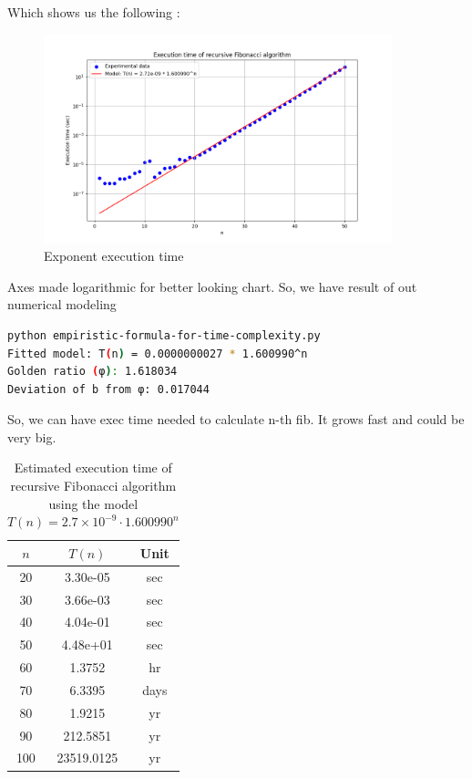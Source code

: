 \documentclass{article}
\begin{document}
Which shows us the following : 
\begin{figure}[H]
	\centering
	\includegraphics[width=0.9\textwidth]{./recursive-time-exec/experimental-data-formula.png}
	\caption{Exponent execution time}
	\label{fig:experimental_vs_theoretical}
\end{figure}

Axes made logarithmic for better looking chart.
So, we have result of out numerical modeling 
\begin{lstlisting}[language=bash]
python empiristic-formula-for-time-complexity.py
Fitted model: T(n) = 0.0000000027 * 1.600990^n
Golden ratio (φ): 1.618034
Deviation of b from φ: 0.017044
\end{lstlisting}

So, we can have exec time needed to calculate n-th fib. It grows fast and could be very big.

\begin{table}[h]
	\centering
	\caption{Estimated execution time of recursive Fibonacci algorithm using the model $T(n) = 2.7 \times 10^{-9} \cdot 1.600990^n$}
	\begin{tabular}{|c|c|c|}
		\hline
		$n$ & $T(n)$ & Unit \\
		\hline
		20 & 3.30e-05 & sec \\ 
		\hline
		30 & 3.66e-03 & sec \\ 
		\hline
		40 & 4.04e-01 & sec \\ 
		\hline
		50 & 4.48e+01 & sec \\ 
		\hline
		60 & 1.3752 & hr \\ 
		\hline
		70 & 6.3395 & days \\ 
		\hline
		80 & 1.9215 & yr \\ 
		\hline
		90 & 212.5851 & yr \\ 
		\hline
		100 & 23519.0125 & yr \\ 
		\hline
		
	\end{tabular}
\end{table}
\end{document}
